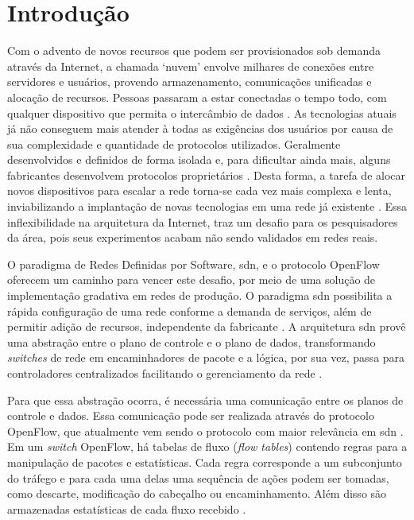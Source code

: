 \chapter{Introdução}
\label{sec:introducao}

Com o advento de novos recursos que podem ser provisionados sob demanda através da Internet, a chamada ‘nuvem’ envolve milhares de conexões entre servidores e usuários, provendo armazenamento, comunicações unificadas e alocação de recursos. Pessoas passaram a estar conectadas o tempo todo, com qualquer dispositivo que permita o intercâmbio de dados \cite{Seeber:2015}. As tecnologias atuais já não conseguem mais atender à todas as exigências dos usuários por causa de sua complexidade e quantidade de protocolos utilizados. Geralmente desenvolvidos e definidos de forma isolada e, para dificultar ainda mais, alguns fabricantes desenvolvem protocolos proprietários \cite{Kim:2013, Soares:2015}. Desta forma, a tarefa de alocar novos dispositivos para escalar a rede torna-se cada vez mais complexa e lenta, inviabilizando a implantação de novas tecnologias em uma rede já existente \cite{Kreutz:2014}. Essa inflexibilidade na arquitetura da Internet, traz um desafio para os pesquisadores da área, pois seus experimentos acabam não sendo validados em redes reais. 

O paradigma de Redes Definidas por Software, \gls{sdn}, e o protocolo OpenFlow oferecem um caminho para vencer este desafio, por meio de uma solução de implementação gradativa em redes de produção. O paradigma \gls{sdn} possibilita a rápida configuração de uma rede conforme a demanda de serviços, além de permitir adição de recursos, independente da fabricante \cite{Sayeed:2015}. A arquitetura \gls{sdn} provê uma abstração entre o plano de controle e o plano de dados, transformando \textit{switches} de rede em encaminhadores de pacote e a lógica, por sua vez, passa para controladores centralizados facilitando o gerenciamento da rede \cite{Kreutz:2013}. 

Para que essa abstração ocorra, é necessária uma comunicação entre os planos de controle e dados. Essa comunicação pode ser realizada através do protocolo OpenFlow, que atualmente vem sendo o protocolo com maior relevância em \gls{sdn} \cite{McKeown:2008}. Em um \textit{switch} OpenFlow, há tabelas de fluxo (\textit{flow tables}) contendo regras para a manipulação de pacotes e estatísticas. Cada regra corresponde a um subconjunto do tráfego e para cada uma delas uma sequência de ações podem ser tomadas, como descarte, modificação do cabeçalho ou encaminhamento. Além disso são armazenadas estatísticas de cada fluxo recebido \cite{website:onf}.

